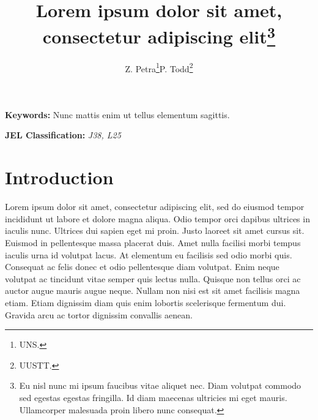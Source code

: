 \documentclass[12pt]{article}
\begin{document}
\title{Lorem ipsum dolor sit amet, consectetur adipiscing elit\thanks{Eu nisl nunc mi ipsum faucibus vitae aliquet nec. Diam volutpat commodo sed egestas egestas fringilla. Id diam maecenas ultricies mi eget mauris. Ullamcorper malesuada proin libero nunc consequat.}}
\author{Z. Petra\thanks{%
UNS.}\quad P. Todd\thanks{UUSTT.}}

\maketitle


\begin{abstract}
\end{abstract}

\textbf{Keywords:} Nunc mattis enim ut tellus elementum sagittis.

\textbf{JEL Classification:} \textit{J38, L25}

\newpage

\section{Introduction} \label{sec:introduction}

Lorem ipsum dolor sit amet, consectetur adipiscing elit, sed do eiusmod tempor incididunt ut labore et dolore magna aliqua. Odio tempor orci dapibus ultrices in iaculis nunc. Ultrices dui sapien eget mi proin. Justo laoreet sit amet cursus sit. Euismod in pellentesque massa placerat duis. Amet nulla facilisi morbi tempus iaculis urna id volutpat lacus. At elementum eu facilisis sed odio morbi quis. Consequat ac felis donec et odio pellentesque diam volutpat. Enim neque volutpat ac tincidunt vitae semper quis lectus nulla. Quisque non tellus orci ac auctor augue mauris augue neque. Nullam non nisi est sit amet facilisis magna etiam. Etiam dignissim diam quis enim lobortis scelerisque fermentum dui. Gravida arcu ac tortor dignissim convallis aenean.
\end{document}
